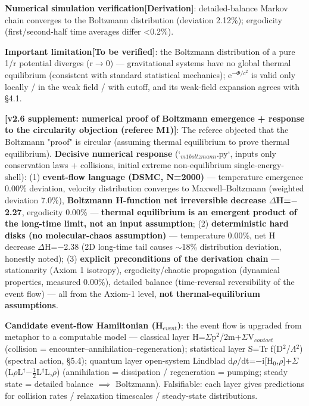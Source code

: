 \documentclass[12pt]{article}
\newcommand{\mtag}[1]{\textbf{[#1]}}
\newcommand{\up}[1]{\ensuremath{^{#1}}}
\newcommand{\down}[1]{\ensuremath{_{#1}}}
\begin{document}
\textbf{Numerical simulation verification}\mtag{Derivation}: detailed-balance Markov chain converges to the Boltzmann distribution (deviation 2.12\%); ergodicity (first/second-half time averages differ <0.2\%).

\textbf{Important limitation}\mtag{To be verified}: the Boltzmann distribution of a pure 1/r potential diverges (r\ensuremath{\to}0) --- gravitational systems have no global thermal equilibrium (consistent with standard statistical mechanics); e\up{-\Phi{}/c^{2}} is valid only locally / in the weak field / with cutoff, and its weak-field expansion agrees with \S{}4.1.

\textbf{\mtag{v2.6 supplement: numerical proof of Boltzmann emergence + response to the circularity objection (referee M1)}}:
The referee objected that the Boltzmann "proof" is circular (assuming thermal equilibrium to prove thermal equilibrium). \textbf{Decisive numerical response} (`\down{m1}\down{boltzmann}.py`, inputs only conservation laws + collisions, initial extreme non-equilibrium single-energy-shell): (1) \textbf{event-flow language (DSMC, N=2000)} --- temperature emergence 0.00\% deviation, velocity distribution converges to Maxwell--Boltzmann (weighted deviation 7.0\%), \textbf{Boltzmann H-function net irreversible decrease \ensuremath{\Delta}H=\ensuremath{-}2.27}, ergodicity 0.00\% --- \textbf{thermal equilibrium is an emergent product of the long-time limit, not an input assumption}; (2) \textbf{deterministic hard disks (no molecular-chaos assumption)} --- temperature 0.00\%, net H decrease \ensuremath{\Delta}H=\ensuremath{-}2.38 (2D long-time tail causes \ensuremath{\sim}18\% distribution deviation, honestly noted); (3) \textbf{explicit preconditions of the derivation chain} --- stationarity (Axiom 1 isotropy), ergodicity/chaotic propagation (dynamical properties, measured 0.00\%), detailed balance (time-reversal reversibility of the event flow) --- all from the Axiom-1 level, \textbf{not thermal-equilibrium assumptions}.

\textbf{Candidate event-flow Hamiltonian (H\down{event})}: the event flow is upgraded from metaphor to a computable model --- classical layer H=\ensuremath{\Sigma}p\up{2}/2m+\ensuremath{\Sigma}V\down{contact} (collision = encounter--annihilation--regeneration); statistical layer S=Tr f(D\up{2}/\ensuremath{\Lambda}\up{2}) (spectral action, \S{}5.4); quantum layer open-system Lindblad d\ensuremath{\rho}/dt=\ensuremath{-}i[H\down{0},\ensuremath{\rho}]+\ensuremath{\Sigma}(L\ensuremath{\rho}L\ensuremath{^\dagger}\ensuremath{-}\ensuremath{\tfrac12}{L\ensuremath{^\dagger}L,\ensuremath{\rho}}) (annihilation = dissipation / regeneration = pumping; steady state = detailed balance \ensuremath{\implies} Boltzmann). Falsifiable: each layer gives predictions for collision rates / relaxation timescales / steady-state distributions.
\end{document}
